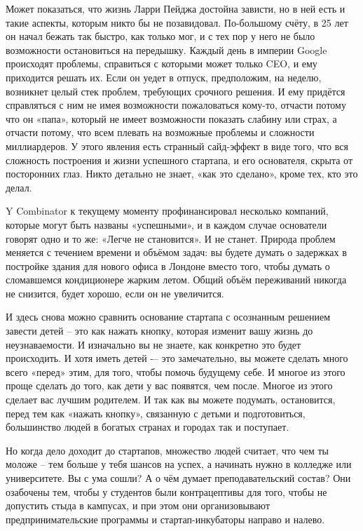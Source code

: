 \documentclass[ebook,12pt,oneside,openany]{memoir}
\begin{document}
Может показаться, что жизнь Ларри Пейджа достойна зависти, но в ней
есть и такие аспекты, которым никто бы не позавидовал. По-большому
счёту, в 25 лет он начал бежать так быстро, как только мог, и с тех
пор у него не было возможности остановиться на передышку. Каждый день
в империи Google происходят проблемы, справиться с которыми может
только CEO, и ему приходится решать их. Если он уедет в отпуск,
предположим, на неделю, возникнет целый стек проблем, требующих
срочного решения. И ему придётся справляться с ним не имея возможности
пожаловаться кому-то, отчасти потому что он «папа», который не имеет
возможности показать слабину или страх, а отчасти потому, что всем
плевать на возможные проблемы и сложности миллиардеров. У этого
явления есть странный сайд-эффект в виде того, что вся сложность
построения и жизни успешного стартапа, и его основателя, скрыта от
посторонних глаз. Никто детально не знает, «как это сделано», кроме
тех, кто это делал.

Y Combinator к текущему моменту профинансировал несколько компаний,
которые могут быть названы «успешными», и в каждом случае основатели
говорят одно и то же: «Легче не становится». И не станет. Природа
проблем меняется с течением времени и объёмом задач: вы будете думать
о задержках в постройке здания для нового офиса в Лондоне вместо того,
чтобы думать о сломавшемся кондиционере жарким летом. Общий объём
переживаний никогда не снизится, будет хорошо, если он не увеличится.

И здесь снова можно сравнить основание стартапа с осознанным решением
завести детей – это как нажать кнопку, которая изменит вашу жизнь до
неузнаваемости. И изначально вы не знаете, как конкретно это будет
происходить. И хотя иметь детей -– это замечательно, вы можете сделать
много всего «перед» этим, для того, чтобы помочь будущему себе. И
многое из этого проще сделать до того, как дети у вас появятся, чем
после. Многое из этого сделает вас лучшим родителем. И так как вы
можете подумать, остановится, перед тем как «нажать кнопку», связанную
с детьми и подготовиться, большинство людей в богатых странах и
городах так и поступает.

Но когда дело доходит до стартапов, множество людей считает, что чем
ты моложе – тем больше у тебя шансов на успех, а начинать нужно в
колледже или университете. Вы с ума сошли? А о чём думает
преподавательский состав? Они озабочены тем, чтобы у студентов были
контрацептивы для того, чтобы не допустить стыда в кампусах, и при
этом они организовывают предпринимательские программы и
стартап-инкубаторы направо и налево.
\end{document}
